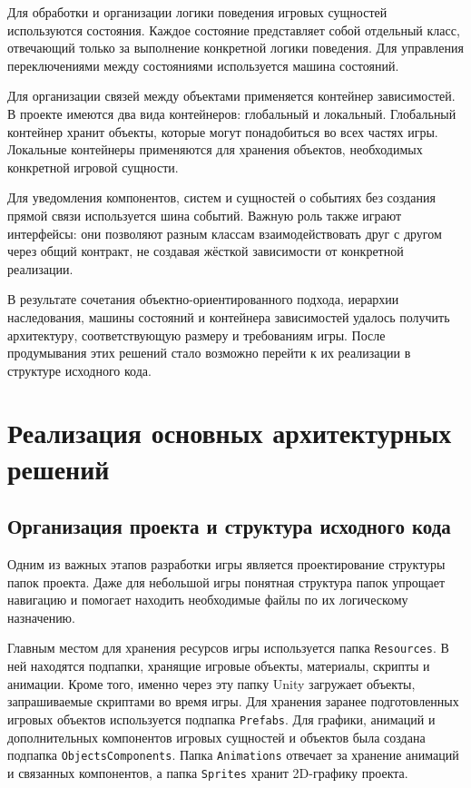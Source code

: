 \documentclass[a4paper,12pt]{report}
\begin{document}
Для обработки и организации логики поведения игровых сущностей используются состояния. Каждое состояние представляет собой отдельный класс, отвечающий только за выполнение конкретной логики поведения. Для управления переключениями между состояниями используется машина состояний.

Для организации связей между объектами применяется контейнер зависимостей. В проекте имеются два вида контейнеров: глобальный и локальный. Глобальный контейнер хранит объекты, которые могут понадобиться во всех частях игры. Локальные контейнеры применяются для хранения объектов, необходимых конкретной игровой сущности.

Для уведомления компонентов, систем и сущностей о событиях без создания прямой связи используется шина событий. Важную роль также играют интерфейсы: они позволяют разным классам взаимодействовать друг с другом через общий контракт, не создавая жёсткой зависимости от конкретной реализации.

В результате сочетания объектно-ориентированного подхода, иерархии наследования, машины состояний и контейнера зависимостей удалось получить архитектуру, соответствующую размеру и требованиям игры. После продумывания этих решений стало возможно перейти к их реализации в структуре исходного кода.

\chapter{Реализация основных архитектурных решений}\label{chapter:implementation}

\section{Организация проекта и структура исходного кода}

Одним из важных этапов разработки игры является проектирование структуры папок проекта. Даже для небольшой игры понятная структура папок упрощает навигацию и помогает находить необходимые файлы по их логическому назначению.

Главным местом для хранения ресурсов игры используется папка \texttt{Resources}. В ней находятся подпапки, хранящие игровые объекты, материалы, скрипты и анимации. Кроме того, именно через эту папку Unity загружает объекты, запрашиваемые скриптами во время игры. Для хранения заранее подготовленных игровых объектов используется подпапка \texttt{Prefabs}. Для графики, анимаций и дополнительных компонентов игровых сущностей и объектов была создана подпапка \texttt{ObjectsComponents}. Папка \texttt{Animations} отвечает за хранение анимаций и связанных компонентов, а папка \texttt{Sprites} хранит 2D-графику проекта.
\end{document}
